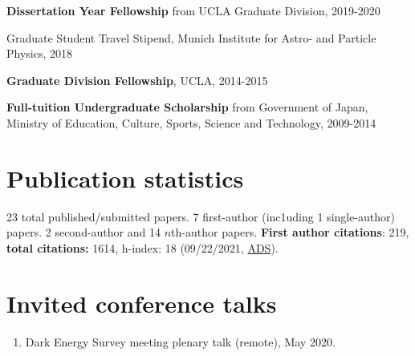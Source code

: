 \documentclass[margin, line]{res}
\begin{document}
\begin{resume}
\vspace*{-2.5mm}
\textbf{Dissertation Year Fellowship} from UCLA Graduate Division, 2019-2020%

\vspace*{-2.5mm}
Graduate Student Travel Stipend, {Munich Institute for Astro- and Particle Physics}, 2018%


\vspace*{-2.5mm}
\textbf{Graduate Division Fellowship}, UCLA, 2014-2015%

\vspace*{-2.5mm}
\textbf{Full-tuition Undergraduate Scholarship} from {Government of Japan, Ministry of Education, Culture, Sports, Science and Technology}, 2009-2014%

\section{\sc Publication statistics} 23 total published/submitted papers. {7 first-author (inc1uding 1 single-author) papers}. {2 second-author and 14 $n$th-author} papers. \textbf{First author citations}: 219, \textbf{total citations:} 1614, h-index: 18 (09/22/2021, \href{https://ui.adsabs.harvard.edu/user/libraries/NYgiA71JS4CR85Tt8CgJsw}{ADS}).
\vspace*{2.5mm}

\section{\sc Invited conference talks}
\begin{enumerate}
	\item Dark Energy Survey meeting plenary talk (remote), May 2020.	
\end{enumerate}


\end{resume}
\end{document}
